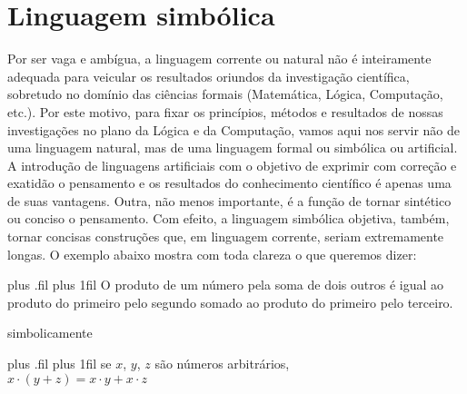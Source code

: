 \newpage

\section{Linguagem simbólica}
Por ser vaga e ambígua, a linguagem corrente ou natural não é inteiramente adequada para veicular os resultados oriundos da investigação científica, sobretudo no domínio das ciências formais (Matemática, Lógica, Computação, etc.).
Por este motivo, para fixar os princípios, métodos e resultados de nossas investigações no plano da Lógica e da Computação, vamos aqui nos servir não de uma linguagem natural, mas de uma linguagem formal ou simbólica ou artificial.
A introdução de linguagens artificiais com o objetivo de exprimir com correção e exatidão o pensamento e os resultados do conhecimento científico é apenas uma de suas vantagens.
Outra, não menos importante, é a função de tornar sintético ou conciso o pensamento.
Com efeito, a linguagem simbólica objetiva, também, tornar concisas construções que, em linguagem corrente, seriam extremamente longas.
O exemplo abaixo mostra com toda clareza o que queremos dizer:

\vskip 1cm

\begin{center}
    \noindent\texttt{}
\end{center}
\vspace{-1\baselineskip} %

\begingroup

    \leftskip=3.3cm plus .fil \rightskip=3.3cm
    \parfillskip=0.5cm plus 1fil
    \noindent O produto de um número pela soma de dois outros é igual ao produto do primeiro pelo segundo somado ao produto do primeiro pelo terceiro.

    \vspace{-1\baselineskip} %
    \begin{center}
        \noindent\texttt{}
    \end{center}

    \centering simbolicamente

    \begin{center}
        \noindent\texttt{}
    \end{center}
    \vspace{-1\baselineskip} %

    \leftskip=3.6cm plus .fil \rightskip=3cm
    \parfillskip=0.5cm plus 1fil
    \noindent \centering se $x$, $y$, $z$ são números arbitrários,\\
    $x \cdot (y + z) = x \cdot y + x \cdot z$

